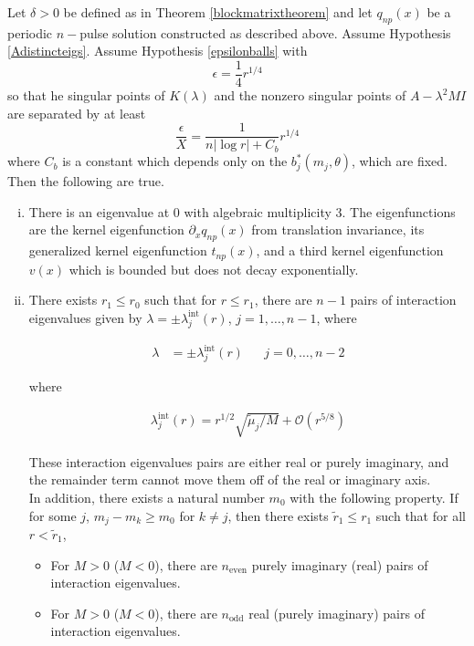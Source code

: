 \documentclass[thesis.tex]{subfiles}
\begin{document}
\begin{theorem}\label{locateeigtheorem}
Let $\delta > 0$ be defined as in Theorem \ref{blockmatrixtheorem} and let $q_{np}(x)$ be a periodic $n-$pulse solution constructed as described above. Assume Hypothesis \ref{Adistincteigs}. Assume Hypothesis \ref{epsilonballs} with
\[
\epsilon = \frac{1}{4}r^{1/4}
\]
so that he singular points of $K(\lambda)$ and the nonzero singular points of $A - \lambda^2 M I$ are separated by at least
\[
\frac{\epsilon}{X} = \frac{1}{n |\log r| + C_b} r^{1/4}
\]
where $C_b$ is a constant which depends only on the $b_j^*(m_j, \theta) $, which are fixed. \\

Then the following are true.

\begin{enumerate}[(i)]

\item There is an eigenvalue at 0 with algebraic multiplicity 3. The eigenfunctions are the kernel eigenfunction $\partial_x q_{np}(x)$ from translation invariance, its generalized kernel eigenfunction $t_{np}(x)$, and a third kernel eigenfunction $v(x)$ which is bounded but does not decay exponentially.

\item There exists $r_1 \leq r_0$ such that for $r \leq r_1$, there are $n - 1$ pairs of interaction eigenvalues given by $\lambda = \pm \lambda^{\text{int}}_j(r)$, $j = 1, \dots, n-1$, where

\begin{align*}
\lambda &= \pm \lambda^{\text{int}}_j(r) && j = 0, \dots, n-2
\end{align*}

where

\begin{align*}
\lambda^{\text{int}}_j(r) = r^{1/2} \sqrt{\tilde{\mu}_j / M} + \mathcal{O}(r^{5/8})
\end{align*}

These interaction eigenvalues pairs are either real or purely imaginary, and the remainder term cannot move them off of the real or imaginary axis.\\

In addition, there exists a natural number $m_0$ with the following property. If  for some $j$, $m_j - m_k \geq m_0$ for $k \neq j$, then there exists $\tilde{r}_1 \leq r_1$ such that for all $r < \tilde{r}_1$, 

\begin{itemize}
\item For $M > 0$ ($M < 0$), there are $n_{\text{even}}$ purely imaginary (real) pairs of interaction eigenvalues.
\item For $M > 0$ ($M < 0$), there are $n_{\text{odd}}$ real (purely imaginary) pairs of interaction eigenvalues.
\end{itemize}


\end{enumerate}
\end{theorem}
\end{document}
